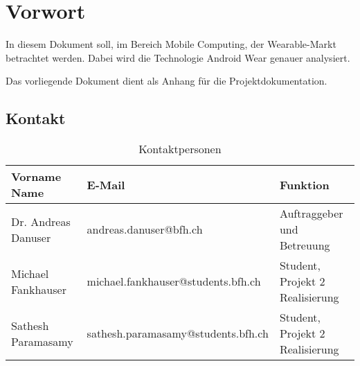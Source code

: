 \chapter*{Vorwort}
\label{chap:vorwort}

In diesem Dokument soll, im Bereich Mobile Computing, der Wearable-Markt betrachtet werden. Dabei wird die Technologie Android Wear genauer analysiert.

Das vorliegende Dokument dient als Anhang für die Projektdokumentation.


\section*{Kontakt}
\label{sec:vorwort_kontakt}

\begin{table}[H]
	\begin{tabular}{lll} \toprule
		\textbf{Vorname Name} & \textbf{E-Mail} & \textbf{Funktion} \\ \midrule
		Dr. Andreas Danuser & andreas.danuser@bfh.ch & Auftraggeber und Betreuung\\ \midrule
		Michael Fankhauser & michael.fankhauser@students.bfh.ch & Student, Projekt 2 Realisierung \\ \midrule
		Sathesh Paramasamy & sathesh.paramasamy@students.bfh.ch & Student, Projekt 2 Realisierung \\ \bottomrule
	\end{tabular}
	\caption*{Kontaktpersonen}
	\label{tab:kontaktpersonen}
\end{table}